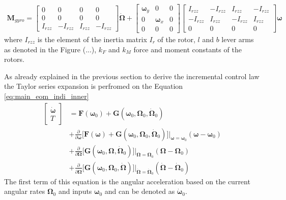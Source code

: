 \documentclass[11pt, a4paper, twoside]{report}
\begin{document}
\begin{equation}
	\begin{split}
	\bm{M}_{gyro} = 
	\begin{bmatrix}
		0 & 0 & 0 & 0 \\
		0 & 0 & 0 & 0 \\
		I_{rzz} & -I_{rzz} & I_{rzz} & -I_{rzz}
	\end{bmatrix} \bm{\dot{\Omega}}	+
	\begin{bmatrix}
		\bm{\omega}_y & 0 & 0 \\
		0 & \bm{\omega}_x & 0 \\
		0 & 0 & 0 
	\end{bmatrix}	
	\begin{bmatrix}
		I_{rzz} & -I_{rzz} & I_{rzz} & -I_{rzz} \\
		-I_{rzz} & I_{rzz} & -I_{rzz} & I_{rzz} \\
		0 & 0 & 0 & 0 
	\end{bmatrix} \bm{\omega}
	\label{eq:m_gyro}
	\end{split}
\end{equation}
where $I_{rzz}$ is the element of the inertia matrix $I_{r}$ of the rotor, $l$ and $b$ lever arms as denoted in the Figure (...), $k_F$ and $k_M$ force and moment constants of the rotors.

As already explained in the previous section to derive the incremental control law the Taylor series expansion is perfromed on the Equation \ref{eq:main_eom_indi_inner}
\begin{equation}
	\begin{split}
		\begin{bmatrix}
			\bm{\dot{\omega}}\\
			T
		\end{bmatrix} &= \bm{F}(\bm{\omega}_0) + \bm{G}(\bm{\omega}_0, \bm{\Omega}_0, \bm{\dot{\Omega}}_0) \\
		&+ \frac{\partial}{\partial \bm{\omega}} \big[\bm{F}(\bm{\omega}) + \bm{G}(\bm{\omega}_0, \bm{\Omega}_0, \bm{\dot{\Omega}}_0) \big] \bigg| _{\bm{\omega}=\bm{\omega}_0} (\bm{\omega}-\bm{\omega}_0) \\
		&+ \frac{\partial}{\partial \bm{\Omega}} \big[\bm{G}(\bm{\omega}_0, \bm{\Omega}, \bm{\dot{\Omega}}_0) \big] \bigg| _{\bm{\Omega}=\bm{\Omega}_0} (\bm{\Omega}-\bm{\Omega}_0) \\
		&+ \frac{\partial}{\partial \bm{\dot{\Omega}}} \big[\bm{G}(\bm{\omega}_0, \bm{\Omega}_0, \bm{\dot{\Omega}}) \big] \bigg| _{\bm{\dot{\Omega}}=\bm{\dot{\Omega}}_0} (\bm{\dot{\Omega}}-\bm{\dot{\Omega}}_0)
		\label{eq:main_eom_indi_inner_taylor}
	\end{split}
\end{equation}
The first term of this equation is the angular acceleration based on the current angular rates $\bm{\Omega}_0$ and inputs $\bm{\omega}_0$ and can be denoted as $\bm{\dot{\omega}}_0$.
\end{document}
